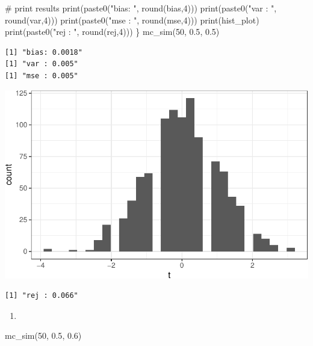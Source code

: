 \documentclass[
  letterpaper,
  DIV=11,
  numbers=noendperiod]{scrreprt}
\newenvironment{Shaded}{\begin{snugshade}}{\end{snugshade}}
\newcommand{\CommentTok}[1]{\textcolor[rgb]{0.37,0.37,0.37}{#1}}
\newcommand{\DecValTok}[1]{\textcolor[rgb]{0.68,0.00,0.00}{#1}}
\newcommand{\FloatTok}[1]{\textcolor[rgb]{0.68,0.00,0.00}{#1}}
\newcommand{\FunctionTok}[1]{\textcolor[rgb]{0.28,0.35,0.67}{#1}}
\newcommand{\NormalTok}[1]{\textcolor[rgb]{0.00,0.23,0.31}{#1}}
\newcommand{\StringTok}[1]{\textcolor[rgb]{0.13,0.47,0.30}{#1}}
\providecommand{\tightlist}{%
  \setlength{\itemsep}{0pt}\setlength{\parskip}{0pt}}\usepackage{longtable,booktabs,array}
\begin{document}
\begin{Shaded}
\begin{Highlighting}[]
  \CommentTok{\# print results}
  \FunctionTok{print}\NormalTok{(}\FunctionTok{paste0}\NormalTok{(}\StringTok{"bias: "}\NormalTok{, }\FunctionTok{round}\NormalTok{(bias,}\DecValTok{4}\NormalTok{)))}
  \FunctionTok{print}\NormalTok{(}\FunctionTok{paste0}\NormalTok{(}\StringTok{"var : "}\NormalTok{, }\FunctionTok{round}\NormalTok{(var,}\DecValTok{4}\NormalTok{)))}
  \FunctionTok{print}\NormalTok{(}\FunctionTok{paste0}\NormalTok{(}\StringTok{"mse : "}\NormalTok{, }\FunctionTok{round}\NormalTok{(mse,}\DecValTok{4}\NormalTok{)))}
  \FunctionTok{print}\NormalTok{(hist\_plot)}
  \FunctionTok{print}\NormalTok{(}\FunctionTok{paste0}\NormalTok{(}\StringTok{"rej : "}\NormalTok{, }\FunctionTok{round}\NormalTok{(rej,}\DecValTok{4}\NormalTok{)))}
\NormalTok{\}}
\FunctionTok{mc\_sim}\NormalTok{(}\DecValTok{50}\NormalTok{, }\FloatTok{0.5}\NormalTok{, }\FloatTok{0.5}\NormalTok{)}
\end{Highlighting}
\end{Shaded}

\begin{verbatim}
[1] "bias: 0.0018"
[1] "var : 0.005"
[1] "mse : 0.005"
\end{verbatim}

\includegraphics{03-estimators_files/figure-pdf/unnamed-chunk-12-1.pdf}

\begin{verbatim}
[1] "rej : 0.066"
\end{verbatim}

\begin{enumerate}
\def\labelenumi{\arabic{enumi}.}
\setcounter{enumi}{4}
\tightlist
\item
\end{enumerate}

\begin{Shaded}
\begin{Highlighting}[]
\FunctionTok{mc\_sim}\NormalTok{(}\DecValTok{50}\NormalTok{, }\FloatTok{0.5}\NormalTok{, }\FloatTok{0.6}\NormalTok{)}
\end{Highlighting}
\end{Shaded}
\end{document}
